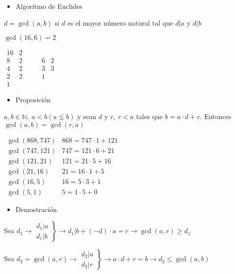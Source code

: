 \documentclass[12pt]{article}
\renewcommand{\arraystretch}{1.15}
\begin{document}
\begin{itemize}[label=\color{red}\textbullet, leftmargin=*]
	\item \color{lightblue}Algoritmo de Euclides
\end{itemize}
$d=\gcd(a,b)$ si $d$ es el mayor número natural tal que $d|a$ y $d|b$

$\gcd(16,6)=2$

{\renewcommand{\arraystretch}{1}$\begin{array}{c|c}
	16 & 2\\
	8 & 2\\
	4 & 2\\
	2& 2\\
	1
\end{array}\qquad\begin{array}{c|c}
6 & 2\\
3 & 3 \\
1 & 
\end{array}$}
\begin{itemize}[label=\color{red}\textbullet, leftmargin=*]
	\item \color{lightblue}Proposición
\end{itemize}
$a,b\in\mathbb{N},~a<b(a\lneq b)$ y sean $d$ y $r,~r<a$ tales que $b=a\cdot d+r$. Entonces $\gcd(a,b)=\gcd(r,a)$

$\begin{array}{cl}
	\gcd(868,747) & 868=747\cdot 1+121\\
	\gcd(747,121) & 747=121\cdot 6+21\\
	\gcd(121, 21) & 121=21\cdot 5+16\\
	\gcd(21, 16) & 21=16\cdot 1+5\\
	\gcd(16,5) & 16 = 5\cdot3+1\\
	\gcd(5,1) & 5=1\cdot 5+0
\end{array}$
\begin{itemize}[label=\color{red}\textbullet, leftmargin=*]
	\item \color{lightblue}Demostración
\end{itemize}
Sea $d_1\rightarrow\left.\begin{array}{l}
	d_1|a\\
	d_1|b
\end{array}\right\}\rightarrow d_1|b+(-d)\cdot a=r\rightarrow\gcd(a,r)\ge d_1$

Sea $d_2=\gcd(a,r)\rightarrow\left.\begin{array}{l}
	d_2|a\\
	d_2|r
\end{array}\right\}\rightarrow a\cdot d+r=b\rightarrow d_2\le\gcd(a,b)$
\end{document}

